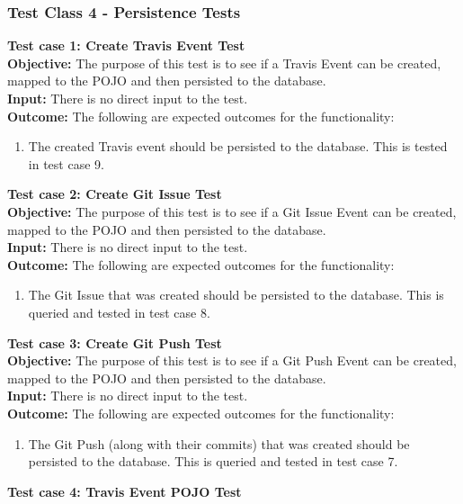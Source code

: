 \documentclass[11pt,a4paper]{article}
\begin{document}
\subsubsection{Test Class 4 - Persistence Tests}	
\textbf{Test case 1: Create Travis Event Test} \\
\textbf{Objective: } The purpose of this test is to see if a Travis Event can be created, mapped to the POJO and then persisted to the database. \\
\textbf{Input: } There is no direct input to the test. \\
\textbf{Outcome: } The following are expected outcomes for the functionality: 
\begin{enumerate}
	\item The created Travis event should be persisted to the database. This is tested in test case 9.\\
\end{enumerate}
\noindent
\textbf{Test case 2: Create Git Issue Test} \\
\textbf{Objective: } The purpose of this test is to see if a Git Issue Event can be created, mapped to the POJO and then persisted to the database. \\
\textbf{Input: } There is no direct input to the test. \\
\textbf{Outcome: } The following are expected outcomes for the functionality: 
\begin{enumerate}
	\item The Git Issue that was created should be persisted to the database. This is queried and tested in test case 8.\\
\end{enumerate}
\noindent
\textbf{Test case 3: Create Git Push Test} \\
\textbf{Objective: } The purpose of this test is to see if a Git Push Event can be created, mapped to the POJO and then persisted to the database. \\
\textbf{Input: } There is no direct input to the test. \\
\textbf{Outcome: } The following are expected outcomes for the functionality: 
\begin{enumerate}
	\item The Git Push (along with their commits) that was created should be persisted to the database. This is queried and tested in test case 7.\\
\end{enumerate}
\noindent
\textbf{Test case 4: Travis Event POJO Test} \\
\end{document}
